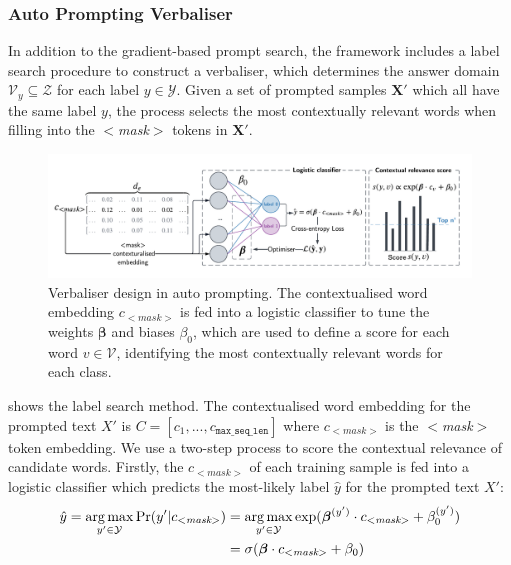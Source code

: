 \subsubsection{Auto Prompting Verbaliser} \label{sec:auto-verb}
In addition to the gradient-based prompt search, the framework includes a label search procedure to construct a verbaliser, which determines the answer domain $\mathcal{V}_{y} \subseteq \mathcal{Z}$ for each label $y \in \mathcal{Y}$. Given a set of prompted samples $\mathbf{X}'$ which all have the same label $y$, the process selects the most contextually relevant words when filling into the $<$\textit{mask}$>$ tokens in $\mathbf{X}'$. 

\begin{figure}[!ht]
    \centering
    \includegraphics[width=\hsize]{figures/preparation_media/prepare-auto-verb.pdf}
    \caption{Verbaliser design in auto prompting. The contextualised word embedding $c_{<\textit{mask}>}$ is fed into a logistic classifier to tune the weights $\boldsymbol{\beta}$ and biases $\beta_0$, which are used to define a score for each word $v \in \mathcal{V}$, identifying the most contextually relevant words for each class.}
    \label{fig:prepare-auto-verb}
\end{figure}

 shows the label search method.  The contextualised word embedding for the prompted text $X'$ is $C = [c_1, ..., c_{\texttt{max\_seq\_len}}]$ where $c_{<\textit{mask}>}$ is the $<$\textit{mask}$>$ token embedding. We use a two-step process to score the contextual relevance of candidate words. Firstly, the $c_{<\textit{mask}>}$ of each training sample is fed into a logistic classifier which predicts the most-likely label $\hat{y}$ for the prompted text $X'$:
\begin{equation}
\begin{split}
    \hat{y} = \operatorname*{arg\,max}_{y' \in \mathcal{Y}} \Pr(y'|c_{<\textit{mask}>}) 
     & = \operatorname*{arg\,max}_{y' \in \mathcal{Y}} \exp(\boldsymbol{\beta}^{(y')} \cdot  c_{<\textit{mask}>} + \beta_0^{(y')}) \\
    & = \sigma(\boldsymbol{\beta} \cdot c_{<\textit{mask}>} + \beta_0)
\end{split}
\end{equation}

